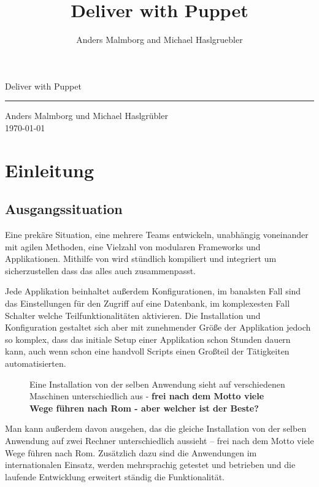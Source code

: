 \documentclass[12pt,a4paper,ngerman]{article}
\title{Deliver with Puppet}
\author{Anders Malmborg and Michael Haslgruebler}
\begin{document}
 \begin{titlepage}
     \begin{flushright}{\huge Deliver with Puppet}
	\end{flushright}
	\hrule
      
      \begin{flushright}
	  {\large Anders Malmborg und Michael Haslgrübler}\\
	  \today
	\end{flushright}
 \end{titlepage}

\pagestyle{plain}

\section{Einleitung}

\subsection{Ausgangssituation}

Eine prekäre Situation, eine mehrere Teams entwickeln, unabhängig voneinander mit agilen Methoden, eine Vielzahl von modularen Frameworks und Applikationen. Mithilfe von \cite{jenkins} wird stündlich kompiliert und integriert um sicherzustellen dass das alles auch zusammenpasst. 

Jede Applikation beinhaltet außerdem Konfigurationen, im banalsten Fall sind das Einstellungen für den Zugriff auf eine Datenbank, im komplexesten Fall Schalter welche Teilfunktionalitäten aktivieren. Die Installation und Konfiguration gestaltet sich aber mit zunehmender Größe der Applikation jedoch so komplex, dass das initiale Setup einer Applikation schon Stunden dauern kann, auch wenn schon eine handvoll Scripts einen Großteil der Tätigkeiten automatisierten. 

\begin{figure}
\vspace{-15pt}
\begin{boxedminipage}{5cm}
Eine Installation von der selben Anwendung sieht auf verschiedenen Maschinen unterschiedlich aus  - \textbf{frei nach dem Motto viele Wege führen nach Rom - aber welcher ist der Beste?}
\end{boxedminipage}
\vspace{-15pt}
\end{figure}
Man kann außerdem davon ausgehen, das die gleiche Installation von der selben Anwendung auf zwei Rechner unterschiedlich aussieht -- frei nach dem Motto viele Wege führen nach Rom. Zusätzlich dazu sind die Anwendungen im internationalen Einsatz, werden mehrsprachig getestet und betrieben und die laufende Entwicklung erweitert ständig die Funktionalität. 
\end{document}
